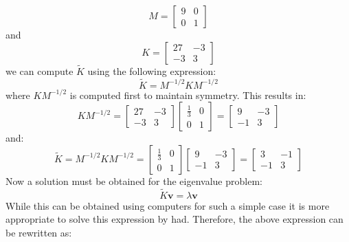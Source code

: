 \documentclass[12pt,letter]{article}
\begin{document}
\begin{example}
	\begin{equation}
		M = \begin{bmatrix} 9 & 0 \\  0  & 1 \end{bmatrix} 
	\end{equation}
	and 
	\begin{equation}
		 K = \begin{bmatrix} 27 & -3 \\    -3  & 3 \end{bmatrix}
	\end{equation}
	we can compute  $\widetilde{K}$ using the following expression:
	\begin{equation}
		 \widetilde{K}=M^{-1/2}KM^{-1/2}
	\end{equation}
	where $KM^{-1/2}$ is computed first to maintain symmetry. This results in:
	\begin{equation}
		 KM^{-1/2} =  \begin{bmatrix} 27 & -3 \\    -3  & 3 \end{bmatrix}  \begin{bmatrix} \frac{1}{3} & 0 \\    0  & 1 \end{bmatrix}= \begin{bmatrix} 9 & -3 \\    -1  & 3 \end{bmatrix}
	\end{equation}
	and:
	\begin{equation}
		  \widetilde{K}=M^{-1/2}KM^{-1/2} =  \begin{bmatrix} \frac{1}{3} & 0 \\    0  & 1 \end{bmatrix} \begin{bmatrix} 9 & -3 \\    -1  & 3 \end{bmatrix} =  \begin{bmatrix} 3 & -1\\  -1  & 3 \end{bmatrix} 
	\end{equation}
	Now a solution must be obtained for the eigenvalue problem:
	\begin{equation}
	\widetilde{K}\textbf{v} =  \lambda \textbf{v}
	\end{equation}
	While this can be obtained using computers for such a simple case it is more appropriate to solve this expression by had. Therefore, the above expression can be rewritten as:

\end{example}
\end{document}
